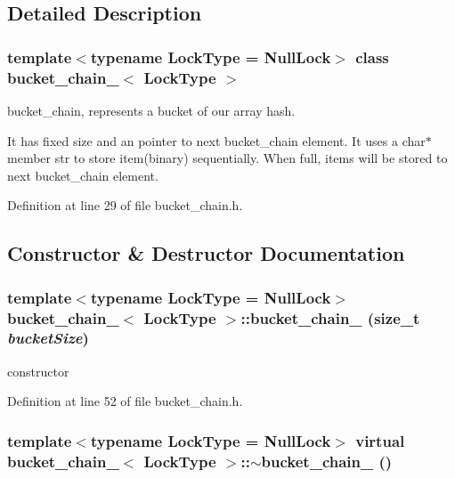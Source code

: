 \subsection{Detailed Description}
\subsubsection*{template$<$typename LockType = NullLock$>$ class bucket\_\-chain\_\-$<$ LockType $>$}

bucket\_\-chain, represents a bucket of our array hash. 

It has fixed size and an pointer to next bucket\_\-chain element. It uses a char$\ast$ member str to store item(binary) sequentially. When full, items will be stored to next bucket\_\-chain element. 

Definition at line 29 of file bucket\_\-chain.h.

\subsection{Constructor \& Destructor Documentation}
\hypertarget{classbucket__chain___3405a155cb7df7c87aa5a0f659b18b9d}{
\subsubsection[{bucket\_\-chain\_\-}]{\setlength{\rightskip}{0pt plus 5cm}template$<$typename LockType  = NullLock$>$ {\bf bucket\_\-chain\_\-}$<$ LockType $>$::{\bf bucket\_\-chain\_\-} (size\_\-t {\em bucketSize})}}
\label{classbucket__chain___3405a155cb7df7c87aa5a0f659b18b9d}


constructor 

Definition at line 52 of file bucket\_\-chain.h.\hypertarget{classbucket__chain___e75a9fd222a47b2273979e156e9e3308}{
\subsubsection[{$\sim$bucket\_\-chain\_\-}]{\setlength{\rightskip}{0pt plus 5cm}template$<$typename LockType  = NullLock$>$ virtual {\bf bucket\_\-chain\_\-}$<$ LockType $>$::$\sim${\bf bucket\_\-chain\_\-} ()}}
\label{classbucket__chain___e75a9fd222a47b2273979e156e9e3308}


